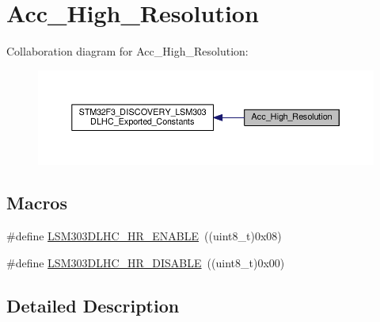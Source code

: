 \hypertarget{group__Acc__High__Resolution}{\section{Acc\+\_\+\+High\+\_\+\+Resolution}
\label{group__Acc__High__Resolution}
}
Collaboration diagram for Acc\+\_\+\+High\+\_\+\+Resolution\+:\nopagebreak
\begin{figure}[H]
\begin{center}
\leavevmode
\includegraphics[width=350pt]{group__Acc__High__Resolution}
\end{center}
\end{figure}
\subsection*{Macros}
\begin{DoxyCompactItemize}
\item 
\#define \hyperlink{group__Acc__High__Resolution_gab43bf14af10012546704ef9c7b31e172}{L\+S\+M303\+D\+L\+H\+C\+\_\+\+H\+R\+\_\+\+E\+N\+A\+B\+L\+E}~((uint8\+\_\+t)0x08)
\item 
\#define \hyperlink{group__Acc__High__Resolution_gae273e59fc3f1730ed23a25f143d4324e}{L\+S\+M303\+D\+L\+H\+C\+\_\+\+H\+R\+\_\+\+D\+I\+S\+A\+B\+L\+E}~((uint8\+\_\+t)0x00)
\end{DoxyCompactItemize}


\subsection{Detailed Description}



